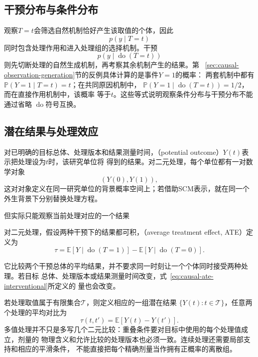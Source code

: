 \subsection{干预分布与条件分布}

观察\(T=t\)会筛选自然机制恰好产生该取值的个体，因此
\[
  p(y\mid T=t)
\]
同时包含处理作用和进入处理组的选择机制。干预
\[
  p(y\mid\operatorname{do}(T=t))
\]
则先切断处理的自然生成机制，再考察其余机制产生的结果。第
~\ref{sec:causal-observation-generation}节的反例具体计算的是事件\(Y=1\)的概率：
两套机制中都有\(\mathbb{P}(Y=1\mid T=t)=t\)；在共同原因机制中，
\(\mathbb{P}(Y=1\mid\operatorname{do}(T=t))=1/2\)，而在直接作用机制中，该概率
等于\(t\)。这些等式说明观察条件分布与干预分布不能通过省略
\(\operatorname{do}\)符号互换。

\subsection{潜在结果与处理效应}

\begin{definition}[潜在结果]
  \label{def:causal-potential-outcomes}
  对已明确的目标总体、处理版本和结果测量时间，（potential outcome）\(Y(t)\)表示把处理设为\(t\)时，该研究单位将
得到的结果。对二元处理，每个单位都有一对数学对象
\[
  (Y(0),Y(1)),
\]
这对对象定义在同一研究单位的背景概率空间上；若借助SCM表示，就在同一个外生背景下分别替换处理方程。
\end{definition}
但实际只能观察当前处理对应的一个结果

\begin{definition}[平均处理效应]
  \label{def:causal-average-treatment-effect}
对二元处理，假设两种干预下的结果都可积，（average treatment effect, ATE）定义为
\begin{equation}
  \tau
  =
  \mathbb{E}[Y\mid\operatorname{do}(T=1)]
  -
  \mathbb{E}[Y\mid\operatorname{do}(T=0)].
  \label{eq:causal-ate-interventional}
\end{equation}
\end{definition}
它比较两个干预总体的平均结果，并不要求同一时刻让一个个体同时接受两种处理。若目标
总体、处理版本或结果测量时间改变，式~\eqref{eq:causal-ate-interventional}所定义的
量也会改变。

若处理取值属于有限集合\(\mathcal{T}\)，则定义相应的一组潜在结果
\(\{Y(t):t\in\mathcal T\}\)，任意两个处理的平均对比为
\[
  \tau(t,t')
  =
  \mathbb{E}[Y(t)-Y(t')].
\]
多值处理并不只是多写几个二元比较：重叠条件要对目标中使用的每个处理值成立，剂量的
物理含义和允许比较的处理版本也必须一致。连续处理还需要局部支持和相应的平滑条件，
不能直接把每个精确剂量当作拥有正概率的离散组。

